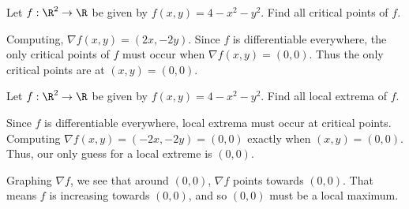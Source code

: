 \begin{example}
	Let $f:\R^2\to\R$ be given by $f(x,y)=4-x^2-y^2$.  Find all critical
	points of $f$.

	Computing, $\nabla f(x,y) = (2x,-2y)$.  Since $f$ is differentiable everywhere,
	the only critical points of $f$ must occur when $\nabla f(x,y)=(0,0)$.  Thus the only
	critical points are at $(x,y)=(0,0)$.
\end{example}

\begin{example}
	Let $f:\R^2\to\R$ be given by $f(x,y)=4-x^2-y^2$.  Find all local extrema of
	$f$.

	Since $f$ is differentiable everywhere, local extrema must occur at critical
	points.  Computing $\nabla f(x,y)=(-2x,-2y)=(0,0)$ exactly when $(x,y)=(0,0)$.
	Thus, our only guess for a local extreme is $(0,0)$.

	\begin{center}
		
	\end{center}

	Graphing $\nabla f$, we see that around $(0,0)$, $\nabla f$ points
	towards $(0,0)$.  That means $f$ is increasing towards $(0,0)$, and so
	$(0,0)$ must be a local maximum.
\end{example}

